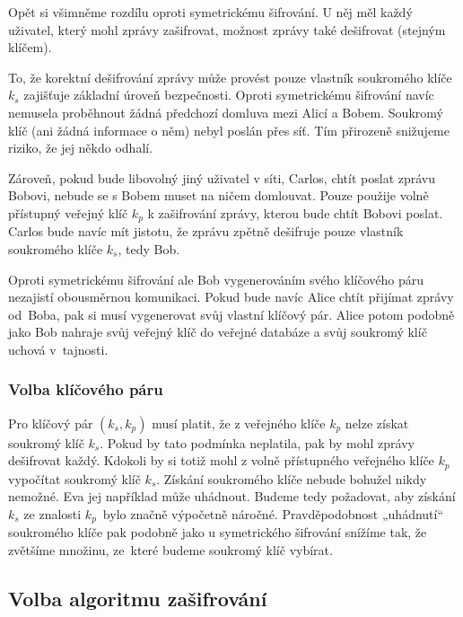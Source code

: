 \documentclass[
  program=infoi,
  biblatex=false,
  figures=true,
  glossaries,
  tables=false,
  sourcecodes=true,
  index
]{kidiplom}
\begin{document}
    \begin{remark}
        Opět si všimněme rozdílu oproti symetrickému šifrování.
        U něj měl každý uživatel, který mohl zprávy zašifrovat, možnost zprávy také dešifrovat (stejným klíčem).
    \end{remark}

    To, že korektní dešifrování zprávy může provést pouze vlastník soukromého klíče $k_s$ zajišťuje základní úroveň bezpečnosti.
    Oproti symetrickému šifrování navíc nemusela proběhnout žádná předchozí domluva mezi Alicí a Bobem.
    Soukromý klíč (ani žádná informace o něm) nebyl poslán přes síť.
    Tím přirozeně snižujeme riziko, že jej někdo odhalí.

    Zároveň, pokud bude libovolný jiný uživatel v síti, Carlos, chtít poslat zprávu Bobovi, nebude se s Bobem muset na ničem domlouvat.
    Pouze použije volně přístupný veřejný klíč $k_p$ k zašifrování zprávy, kterou bude chtít Bobovi poslat.
    Carlos bude navíc mít jistotu, že zprávu zpětně dešifruje pouze vlastník soukromého klíče $k_s$, tedy Bob.

    Oproti symetrickému šifrování ale Bob vygenerováním svého klíčového páru nezajistí obousměrnou komunikaci.
    Pokud bude navíc Alice chtít přijímat zprávy od~Boba, pak si musí vygenerovat svůj vlastní klíčový pár.
    Alice potom podobně jako Bob nahraje svůj veřejný klíč do veřejné databáze a svůj soukromý klíč uchová v~tajnosti.


    \subsubsection{Volba klíčového páru}

        Pro klíčový pár $(k_s, k_p)$ musí platit, že z veřejného klíče $k_p$ nelze získat soukromý klíč $k_s$.
        Pokud by tato podmínka neplatila, pak by mohl zprávy dešifrovat každý.
        Kdokoli by si totiž mohl z volně přístupného veřejného klíče $k_p$ vypočítat soukromý klíč $k_s$.
        Získání soukromého klíče nebude bohužel nikdy nemožné.
        Eva jej například může uhádnout.
        Budeme tedy požadovat, aby získání $k_s$ ze znalosti $k_p$~bylo značně výpočetně náročné.
        Pravděpodobnost „uhádnutí“ soukromého klíče pak podobně jako u symetrického šifrování snížíme tak, že
        zvětšíme množinu, ze~které budeme soukromý klíč vybírat.


\subsection{Volba algoritmu zašifrování}
\end{document}
